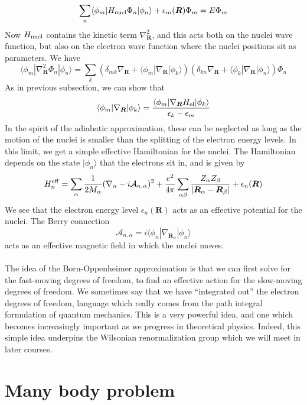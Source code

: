 \documentclass[cyan]{elegantnote}
\begin{document}
\[\sum_n \langle \phi_m | H_{\rm nucl} \Phi_n | \phi_n \rangle + \epsilon_m(\bm{R}) \Phi_m = E\Phi_m\]
Now $H_{\rm nucl}$ contains the kinetic term $\nabla^2_{\bm{R}}$, and this acts both on the nuclei wave function, but also on the electron wave function where the nuclei positions sit as parameters. We have
\[\langle \phi_m | \nabla^2_{\bm{R}} \Phi_n | \phi_n \rangle = \sum_k \left(\delta_{mk} \nabla_{\bm{R}} + \langle \phi_m | \nabla_{\bm{R}} | \phi_k \rangle  \right) \left(\delta_{kn} \nabla_{\bm{R}} + \langle \phi_k | \nabla_{\bm{R}} | \phi_n \rangle  \right) \Phi_n\]
As in previous subsection, we can show that
\[\langle \phi_m | \nabla_{\bm{R}} | \phi_k \rangle = \frac{\langle \phi_m | \nabla_{\bm{R}} H_{\rm el} | \phi_k\rangle}{\epsilon_k - \epsilon_m}\]
In the spirit of the adiabatic approximation, these can be neglected as long as the motion of the nuclei is smaller than the splitting of the electron energy levels.
In this limit, we get a simple effective Hamiltonian for the nuclei. The Hamiltonian depends on the state $|\phi_n\rangle$ that the electrons sit in, and is given by
\[H_n^{\rm eff} = \sum_{\alpha} \frac{1}{2M_{\alpha}} (\nabla_{\alpha} - i\mathcal{A}_{n,\alpha})^2 + \frac{e^2}{4\pi}\sum_{\alpha \beta} \frac{Z_{\alpha} Z_{\beta}}{|\bm{R}_{\alpha} - \bm{R}_{\beta}|} + \epsilon_n(\bm{R}) \]
We see that the electron energy level $\epsilon_n(\bm{R})$ acts as an effective potential for the nuclei. The Berry connection
\[\mathcal{A}_{n,\alpha} = i \langle \phi_n | \nabla_{\bm{R}_{\alpha}} | \phi_n \rangle\]
acts as an effective magnetic field in which the nuclei
moves.
\\ \\
The idea of the Born-Oppenheimer approximation is that we can first solve for the fast-moving degrees of freedom, to find an effective action for the slow-moving degrees
of freedom. We sometimes say that we have ``integrated out'' the electron degrees of freedom, language which really comes from the path integral formulation of quantum mechanics. 
This is a very powerful idea, and one which becomes increasingly important as we progress in theoretical physics. Indeed, this simple idea underpins the Wilsonian
renormalization group which we will meet in later courses.

\chapter{Many body problem}
\end{document}
